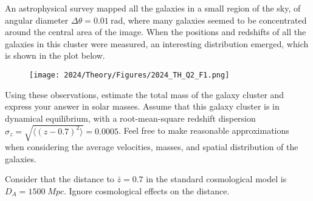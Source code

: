 An astrophysical survey mapped all the galaxies in a small region of the sky, of angular diameter $\Delta \theta = \SI{0.01}{\radian}$, where many galaxies seemed to be concentrated around the central area of the image. When the positions and redshifts of all the galaxies in this cluster were measured, an interesting distribution emerged, which is shown in the plot below.

\begin{figure}[H]
    \centering
    \texttt{[image: 2024/Theory/Figures/2024\_TH\_Q2\_F1.png]}
\end{figure}

Using these observations, estimate the total mass of the galaxy cluster and express your answer in solar masses. Assume that this galaxy cluster is in dynamical equilibrium, with a root-mean-square redshift dispersion $\sigma_z = \sqrt{\langle (z-0.7)^2 \rangle} = 0.0005$. Feel free to make reasonable approximations when considering the average velocities, masses, and spatial distribution of the galaxies.

Consider that the distance to $\bar z=0.7$ in the standard cosmological model is $D_A=1500\;\si{Mpc}$. Ignore cosmological effects on the distance.
